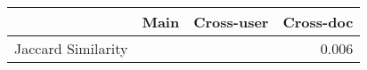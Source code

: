 \begin{table}[]
\caption{}
\label{tab:similarity}
\begin{tabular}{lrrr}
\hline
                   & Main & Cross-user & Cross-doc \\ \hline
Jaccard Similarity &      &            & 0.006     \\ \hline
\end{tabular}
\end{table}
